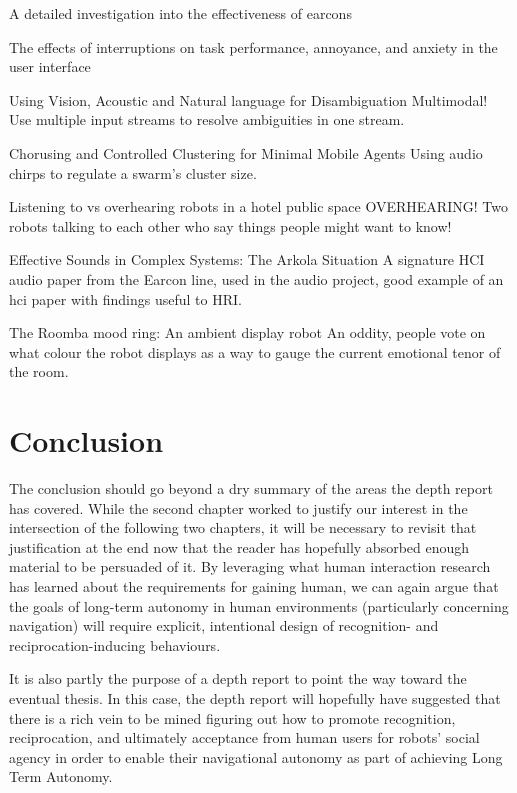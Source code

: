 \documentclass{sfuthesis}
\begin{document}
A detailed investigation into the effectiveness of earcons

The effects of interruptions on task performance, annoyance, and anxiety in the user interface

Using Vision, Acoustic and Natural language for Disambiguation	Multimodal! Use multiple input streams to resolve ambiguities in one stream.

Chorusing and Controlled Clustering for Minimal Mobile Agents	Using audio chirps to regulate a swarm's cluster size.	


Listening to vs overhearing robots in a hotel public space	OVERHEARING! Two robots talking to each other who say things people might want to know!	

Effective Sounds in Complex Systems: The Arkola Situation   A signature HCI audio paper from the Earcon line, used in the audio project, good example of an hci paper with findings useful to HRI.

The Roomba mood ring: An ambient display robot	An oddity, people vote on what colour the robot displays as a way to gauge the current emotional tenor of the room.

\chapter{Conclusion}

The conclusion should go beyond a dry summary of the areas the depth report has covered. While the second chapter worked to justify our interest in the intersection of the following two chapters, it will be necessary to revisit that justification at the end now that the reader has hopefully absorbed enough material to be persuaded of it. By leveraging what human interaction research has learned about the requirements for gaining human, we can again argue that the goals of long-term autonomy in human environments (particularly concerning navigation) will require explicit, intentional design of recognition- and reciprocation-inducing behaviours.

It is also partly the purpose of a depth report to point the way toward the eventual thesis. In this case, the depth report will hopefully have suggested that there is a rich vein to be mined figuring out how to promote recognition, reciprocation, and ultimately acceptance from human users for robots' social agency in order to enable their navigational autonomy as part of achieving Long Term Autonomy.
\end{document}
